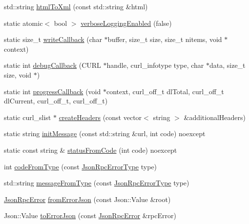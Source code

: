 \begin{DoxyCompactItemize}
std\+::string \hyperlink{namespacedg_1_1deepcore_1_1network_af2d3502a6309acacaebc8b19a0cf76bb}{html\+To\+Xml} (const std\+::string \&html)
\item 
static atomic$<$ bool $>$ \hyperlink{namespacedg_1_1deepcore_1_1network_a31b61d83b19cb48734e04c7e43f6b470}{verbose\+Logging\+Enabled} (false)
\item 
static size\+\_\+t \hyperlink{namespacedg_1_1deepcore_1_1network_a9e2a9407168fd2acdc95c73b187d091b}{write\+Callback} (char $\ast$buffer, size\+\_\+t size, size\+\_\+t nitems, void $\ast$context)
\item 
static int \hyperlink{namespacedg_1_1deepcore_1_1network_a451b4f6cdd41452521a3442c7a0aed9a}{debug\+Callback} (C\+U\+RL $\ast$handle, curl\+\_\+infotype type, char $\ast$data, size\+\_\+t size, void $\ast$)
\item 
static int \hyperlink{namespacedg_1_1deepcore_1_1network_a1cee786cd5accb26ff7bf0e065ddea6c}{progress\+Callback} (void $\ast$context, curl\+\_\+off\+\_\+t dl\+Total, curl\+\_\+off\+\_\+t dl\+Current, curl\+\_\+off\+\_\+t, curl\+\_\+off\+\_\+t)
\item 
static curl\+\_\+slist $\ast$ \hyperlink{namespacedg_1_1deepcore_1_1network_a2f2c3016d250ee26e57336ec000751c9}{create\+Headers} (const vector$<$ string $>$ \&additional\+Headers)
\item 
static string \hyperlink{namespacedg_1_1deepcore_1_1network_af8c6ece14ed242de55ae0198cdd6e44a}{init\+Message} (const std\+::string \&url, int code) noexcept
\item 
static const string \& \hyperlink{namespacedg_1_1deepcore_1_1network_ace31958a77a7f3ce1bd1aa0cf27f72d4}{status\+From\+Code} (int code) noexcept
\item 
int \hyperlink{namespacedg_1_1deepcore_1_1network_a50c68eaf4787d70e3236ceea5c651aed}{code\+From\+Type} (const \hyperlink{namespacedg_1_1deepcore_1_1network_a396e76c62ff66c95c20af09d8e45ce44}{Json\+Rpc\+Error\+Type} type)
\item 
std\+::string \hyperlink{namespacedg_1_1deepcore_1_1network_ad7e27867c00b5fbca5999693c70d9e99}{message\+From\+Type} (const \hyperlink{namespacedg_1_1deepcore_1_1network_a396e76c62ff66c95c20af09d8e45ce44}{Json\+Rpc\+Error\+Type} type)
\item 
\hyperlink{classdg_1_1deepcore_1_1network_1_1_json_rpc_error}{Json\+Rpc\+Error} \hyperlink{namespacedg_1_1deepcore_1_1network_aefe6d53131bd9a612d7d806bfe4358ad}{from\+Error\+Json} (const Json\+::\+Value \&root)
\item 
Json\+::\+Value \hyperlink{namespacedg_1_1deepcore_1_1network_af041406cc8c73fcda34f96399159d9c2}{to\+Error\+Json} (const \hyperlink{classdg_1_1deepcore_1_1network_1_1_json_rpc_error}{Json\+Rpc\+Error} \&rpc\+Error)
\end{DoxyCompactItemize}
